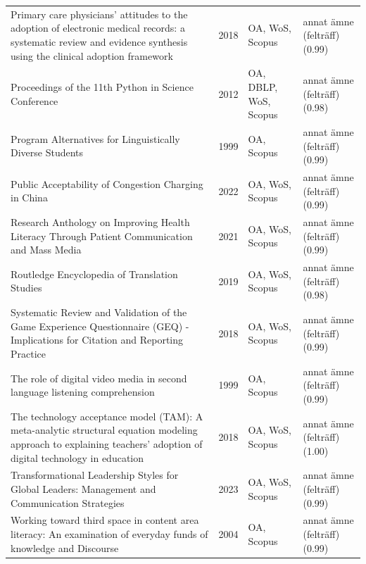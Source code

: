 \begin{longtable}{@{}%
  >{\raggedright\arraybackslash}p{}c%
  >{\raggedright\arraybackslash}p{}%
  >{\raggedright\arraybackslash}p{}@{}}
Primary care physicians' attitudes to the adoption of electronic medical records: a systematic review and evidence synthesis using the clinical adoption framework & 2018 & OA, WoS, Scopus & annat ämne (felträff) (0.99) \\
Proceedings of the 11th Python in Science Conference & 2012 & OA, DBLP, WoS, Scopus & annat ämne (felträff) (0.98) \\
Program Alternatives for Linguistically Diverse Students & 1999 & OA, Scopus & annat ämne (felträff) (0.99) \\
Public Acceptability of Congestion Charging in China & 2022 & OA, WoS, Scopus & annat ämne (felträff) (0.99) \\
Research Anthology on Improving Health Literacy Through Patient Communication and Mass Media & 2021 & OA, WoS, Scopus & annat ämne (felträff) (0.99) \\
Routledge Encyclopedia of Translation Studies & 2019 & OA, WoS, Scopus & annat ämne (felträff) (0.98) \\
Systematic Review and Validation of the Game Experience Questionnaire (GEQ) - Implications for Citation and Reporting Practice & 2018 & OA, WoS, Scopus & annat ämne (felträff) (0.99) \\
The role of digital video media in second language listening comprehension & 1999 & OA, Scopus & annat ämne (felträff) (0.99) \\
The technology acceptance model (TAM): A meta-analytic structural equation modeling approach to explaining teachers' adoption of digital technology in education & 2018 & OA, WoS, Scopus & annat ämne (felträff) (1.00) \\
Transformational Leadership Styles for Global Leaders: Management and Communication Strategies & 2023 & OA, WoS, Scopus & annat ämne (felträff) (0.99) \\
Working toward third space in content area literacy: An examination of everyday funds of knowledge and Discourse & 2004 & OA, Scopus & annat ämne (felträff) (0.99) \\
\end{longtable}
\endgroup
